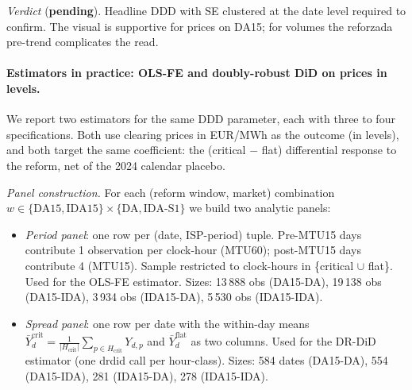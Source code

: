 \documentclass[11pt,a4paper]{article}
\begin{document}
\textit{Verdict} (\textbf{pending}). Headline DDD with SE clustered at the date level required to confirm. The visual is supportive for prices on DA15; for volumes the reforzada pre-trend complicates the read.

\paragraph{Estimators in practice: OLS-FE and doubly-robust DiD on prices in levels.}
We report two estimators for the same DDD parameter, each with three to four specifications. Both use clearing prices in EUR/MWh as the outcome (in levels), and both target the same coefficient: the (critical $-$ flat) differential response to the reform, net of the 2024 calendar placebo.

\textit{Panel construction.} For each (reform window, market) combination $w \in \{\text{DA15}, \text{IDA15}\} \times \{\text{DA}, \text{IDA-S1}\}$ we build two analytic panels:
\begin{itemize}
\item \emph{Period panel}: one row per (date, ISP-period) tuple. Pre-MTU15 days contribute 1 observation per clock-hour (MTU60); post-MTU15 days contribute 4 (MTU15). Sample restricted to clock-hours in \{critical $\cup$ flat\}. Used for the OLS-FE estimator. Sizes: 13\,888 obs (DA15-DA), 19\,138 obs (DA15-IDA), 3\,934 obs (IDA15-DA), 5\,530 obs (IDA15-IDA).
\item \emph{Spread panel}: one row per date with the within-day means $\bar Y^{\text{crit}}_d = \frac{1}{|H_{\text{crit}}|}\sum_{p \in H_{\text{crit}}} Y_{d,p}$ and $\bar Y^{\text{flat}}_d$ as two columns. Used for the DR-DiD estimator (one drdid call per hour-class). Sizes: 584 dates (DA15-DA), 554 (DA15-IDA), 281 (IDA15-DA), 278 (IDA15-IDA).
\end{itemize}
\end{document}
